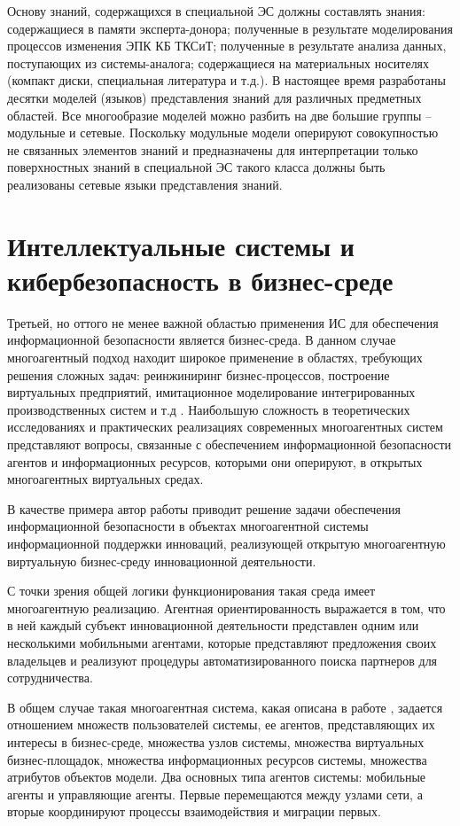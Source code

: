 Основу знаний, содержащихся в специальной ЭС должны составлять знания:
содержащиеся в памяти эксперта-донора; полученные в результате моделирования процессов изменения ЭПК КБ
ТКСиТ; полученные в результате анализа данных, поступающих из системы-аналога; содержащиеся на
материальных носителях (компакт диски, специальная литература и т.д.). В настоящее время разработаны
десятки моделей (языков) представления знаний для различных предметных областей. Все многообразие моделей
можно разбить на две большие группы – модульные и сетевые. Поскольку модульные модели оперируют
совокупностью не связанных элементов знаний и предназначены для интерпретации только поверхностных
знаний в специальной ЭС такого класса должны быть реализованы сетевые языки представления знаний.

\newpage
\section{Интеллектуальные системы и кибербезопасность в бизнес-среде}
Третьей, но оттого не менее важной областью применения ИС для обеспечения информационной безопасности
является бизнес-среда. В данном случае многоагентный подход находит широкое применение в
областях, требующих решения сложных задач: реинжиниринг бизнес-процессов,
построение виртуальных предприятий, имитационное моделирование интегрированных производственных систем
и т.д \cite{mob}. Наибольшую сложность в теоретических исследованиях и практических реализациях современных
многоагентных систем представляют вопросы, связанные с обеспечением информационной безопасности агентов и информационных
ресурсов, которыми они оперируют, в открытых многоагентных виртуальных средах.

В качестве примера автор работы \cite{mob} приводит решение задачи
обеспечения информационной безопасности в объектах многоагентной
системы информационной поддержки инноваций, реализующей
открытую многоагентную виртуальную бизнес-среду инновационной деятельности.

С точки зрения общей логики функционирования такая среда имеет многоагентную реализацию.
Агентная ориентированность выражается в том, что в ней каждый субъект инновационной деятельности
представлен одним или несколькими мобильными агентами, которые представляют предложения
своих владельцев и реализуют процедуры автоматизированного поиска партнеров для сотрудничества.

В общем случае такая многоагентная система, какая описана в работе \cite{mob}, задается отношением множеств
пользователей системы, ее агентов, представляющих их интересы в бизнес-среде, множества узлов системы,
множества виртуальных бизнес-площадок, множества информационных ресурсов системы, множества атрибутов объектов модели.
Два основных типа агентов системы: мобильные агенты и управляющие агенты. Первые перемещаются между узлами сети,
а вторые координируют процессы взаимодействия и миграции первых.

